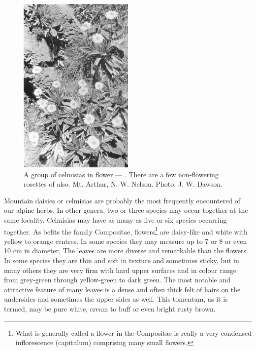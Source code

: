 \begin{figure}
	\includegraphics[width=0.5\textwidth]{graphics/figure102celmisias.jpg}
	\centering
	\caption[A group of celmisias in flower]{A group of celmisias in flower — .
    There are a few non-flowering rosettes of  also.
    Mt. Arthur,  N. W. Nelson.
	Photo: J. W. Dawson.}
	\label{fig:102celmisias}
\end{figure}

Mountain daisies or celmisias are probably the most frequently encountered of our alpine herbs.
In other genera, two or three species may occur together at the same locality.
Celmisias may have as many as five or six species occurring together.
As befits the family Compositae,  flowers\footnote{What is generally called a flower in the Compositae is really a very condensed inflorescence (capitulum) comprising many small flowers.} are daisy-like and white with yellow to orange centres.
In some species they may measure up to 7 or 8 or even 10 cm in diameter, The leaves are more diverse and remarkable than the flowers.
In some species they are thin and soft in texture and sometimes sticky, but in many others they are very firm with hard upper surfaces and in colour range from grey-green through yellow-green to dark green.
The most notable and attractive feature of many  leaves is a dense and often thick felt of hairs on the undersides and sometimes the upper sides as well.
This tomentum, as it is termed, may be pure white, cream to buff or even bright rusty brown.


